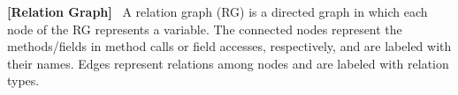 





\begin{definition}{\bf [Relation Graph]}~\cite{icse19}
A relation graph (RG) is a directed graph
%
in which each node of the RG represents a variable. The connected
nodes represent the methods/fields in method calls or field accesses,
respectively, and are labeled with their names. Edges represent
relations among nodes and are labeled with relation types.
\end{definition}

%

